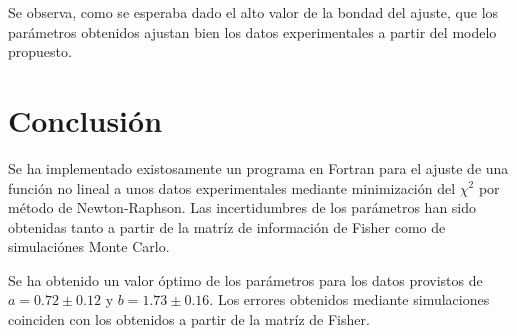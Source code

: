 \documentclass{article}
\begin{document}
    Se observa, como se esperaba dado el alto valor de la bondad del ajuste,
que los parámetros obtenidos ajustan bien los datos experimentales a
partir del modelo propuesto.


    \section{Conclusión}


    Se ha implementado existosamente un programa en Fortran para el ajuste
de una función no lineal a unos datos experimentales mediante
minimización del \(\chi^2\) por método de Newton-Raphson. Las
incertidumbres de los parámetros han sido obtenidas tanto a partir de la
matríz de información de Fisher como de simulaciónes Monte Carlo.

Se ha obtenido un valor óptimo de los parámetros para los datos
provistos de \(a = 0.72 \pm 0.12\) y \(b = 1.73 \pm 0.16\). Los errores
obtenidos mediante simulaciones coinciden con los obtenidos a partir de
la matríz de Fisher.


    
    
    
    
\end{document}
